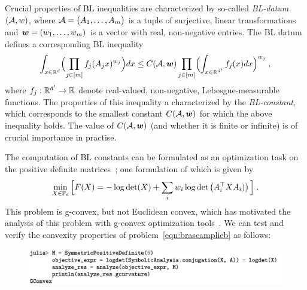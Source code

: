 \documentclass[twoside,11pt]{article}
\begin{document}
Crucial properties of BL inequalities are characterized by so-called  \emph{BL-datum} $(\mathcal{A},w)$, where $\mathcal{A} = \big( A_1, \dots, A_m \big)$ is a tuple of surjective, linear transformations and  $\boldsymbol{w}=(w_1,\dots,w_m)$ is a vector with real, non-negative entries. The BL datum defines a corresponding BL inequality 
\begin{equation}\label{eq:BL-inequ}
\int_{x \in \mathbb{R}^d} \Bigl( \prod_{j \in [m]} f_j (A_j x)^{w_j} \Bigr) dx 
\leq C(\mathcal{A},\boldsymbol{w}) \prod_{j \in [m]} \Bigl( \int_{x \in \mathbb{R}^{d'}} f_j (x) dx	\Bigr)^{w_j} \; ,
\end{equation}
where $f_j: \mathbb{R}^{d'} \rightarrow \mathbb{R}$ denote real-valued, non-negative, Lebesgue-measurable functions. The properties of this inequality a characterized by the \emph{BL-constant}, which corresponds to the smallest constant $C(\mathcal{A},\boldsymbol{w})$ for which the above inequality holds. The value of $C(\mathcal{A},\boldsymbol{w})$ (and whether it is finite or infinite) is of crucial importance in practise. 

The computation of BL constants can be formulated as 
an optimization task on the positive definite matrices~\citep{BL1,BL2}; one formulation of which is given by~\citep{sra_brascamplieb} 
\begin{equation}
\label{eqn:brascamplieb}
    \min_{X \in \mathbb{P}_d} \Big[ F(X)=-\log \operatorname{det}(X)+\sum_i w_i \log \operatorname{det}\left(A_i^\top X A_i)\right) \Big] \; .
\end{equation}
This problem is g-convex, but not Euclidean convex, which has motivated the analysis of this problem with g-convex optimization tools~\citep{gurvits,garg2018algorithmic,burgisser2018efficient,thompson}.
We can test and verify the convexity properties of problem~\ref{eqn:brascamplieb} as follows:



\begin{figure}[h!]
    \centering
    \includegraphics[width=\linewidth]{listing/6.png}
\end{figure}
\end{document}
